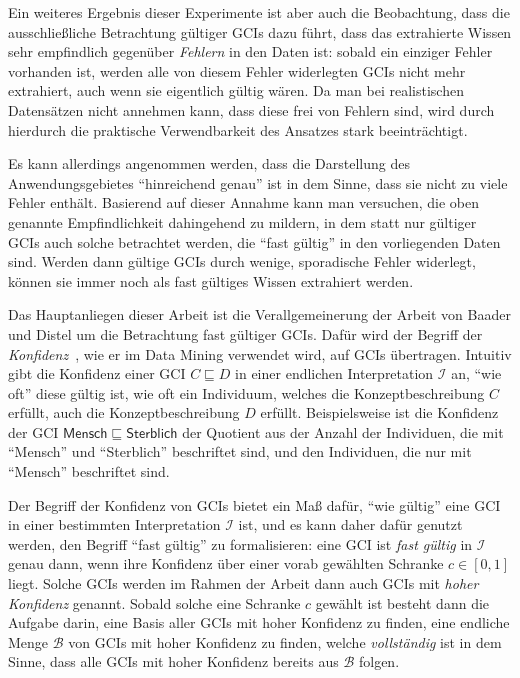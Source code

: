\documentclass[ngerman,fleqn,DIV=14]{scrartcl}
\begin{document}
Ein weiteres Ergebnis dieser Experimente ist aber auch die Beobachtung, dass die
ausschließliche Betrachtung gültiger GCIs dazu führt, dass das extrahierte Wissen sehr
empfindlich gegenüber \emph{Fehlern} in den Daten ist: sobald ein einziger Fehler
vorhanden ist, werden alle von diesem Fehler widerlegten GCIs nicht mehr extrahiert, auch
wenn sie eigentlich gültig wären.  Da man bei realistischen Datensätzen nicht annehmen
kann, dass diese frei von Fehlern sind, wird durch hierdurch die praktische Verwendbarkeit
des Ansatzes stark beeinträchtigt.

Es kann allerdings angenommen werden, dass die Darstellung des Anwendungsgebietes
\enquote{hinreichend genau} ist in dem Sinne, dass sie nicht zu viele Fehler enthält.
Basierend auf dieser Annahme kann man versuchen, die oben genannte Empfindlichkeit
dahingehend zu mildern, in dem statt nur gültiger GCIs auch solche betrachtet werden, die
\enquote{fast gültig} in den vorliegenden Daten sind.  Werden dann gültige GCIs durch
wenige, sporadische Fehler widerlegt, können sie immer noch als fast gültiges Wissen
extrahiert werden.

Das Hauptanliegen dieser Arbeit ist die Verallgemeinerung der Arbeit von Baader und Distel
um die Betrachtung fast gültiger GCIs.  Dafür wird der Begriff der
\emph{Konfidenz}~\cite{arules:agrawal:association-rules}, wie er im Data Mining verwendet
wird, auf GCIs übertragen.  Intuitiv gibt die Konfidenz einer GCI $C \sqsubseteq D$ in
einer endlichen Interpretation $\mathcal{I}$ an, \enquote{wie oft} diese gültig ist, \dh
wie oft ein Individuum, welches die Konzeptbeschreibung $C$ erfüllt, auch die
Konzeptbeschreibung $D$ erfüllt.  Beispielsweise ist die Konfidenz der GCI
$\mathsf{Mensch} \sqsubseteq \mathsf{Sterblich}$ der Quotient aus der Anzahl der
Individuen, die mit \enquote{\textsf{Mensch}} und \enquote{\textsf{Sterblich}} beschriftet
sind, und den Individuen, die nur mit \enquote{\textsf{Mensch}} beschriftet sind.

Der Begriff der Konfidenz von GCIs bietet ein Maß dafür, \enquote{wie gültig} eine GCI in
einer bestimmten Interpretation $\mathcal{I}$ ist, und es kann daher dafür genutzt werden,
den Begriff \enquote{fast gültig} zu formalisieren: eine GCI ist \emph{fast gültig} in
$\mathcal{I}$ genau dann, wenn ihre Konfidenz über einer vorab gewählten Schranke $c \in
[0,1]$ liegt.  Solche GCIs werden im Rahmen der Arbeit dann auch GCIs mit \emph{hoher
  Konfidenz} genannt.  Sobald solche eine Schranke $c$ gewählt ist besteht dann die
Aufgabe darin, eine Basis aller GCIs mit hoher Konfidenz zu finden, \dh eine endliche
Menge $\mathcal{B}$ von GCIs mit hoher Konfidenz zu finden, welche \emph{vollständig} ist
in dem Sinne, dass alle GCIs mit hoher Konfidenz bereits aus $\mathcal{B}$ folgen.
\end{document}
